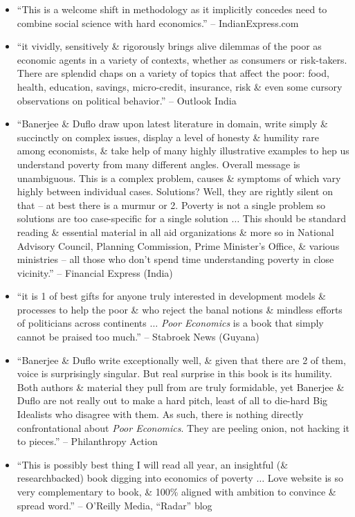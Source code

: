 \documentclass{article}
\begin{document}
\begin{enumerate}
\begin{itemize}
		\item ``This is a welcome shift in methodology as it implicitly concedes need to combine social science with hard economics.'' -- IndianExpress.com
		\item ``it vividly, sensitively \& rigorously brings alive dilemmas of the poor as economic agents in a variety of contexts, whether as consumers or risk-takers. There are splendid chaps on a variety of topics that affect the poor: food, health, education, savings, micro-credit, insurance, risk \& even some cursory observations on political behavior.'' -- Outlook India
		\item ``{\sc Banerjee \& Duflo} draw upon latest literature in domain, write simply \& succinctly on complex issues, display a level of honesty \& humility rare among economists, \& take help of many highly illustrative examples to hep us understand poverty from many different angles. Overall message is unambiguous. This is a complex problem, causes \& symptoms of which vary highly between individual cases. Solutions? Well, they are rightly silent on that -- at best there is a murmur or 2. Poverty is not a single problem so solutions are too case-specific for a single solution $\ldots$ This should be standard reading \& essential material in all aid organizations \& more so in National Advisory Council, Planning Commission, Prime Minister's Office, \& various ministries -- all those who don't spend time understanding poverty in close vicinity.'' -- Financial Express (India)
		\item ``it is 1 of best gifts for anyone truly interested in development models \& processes to help the poor \& who reject the banal notions \& mindless efforts of politicians across continents $\ldots$ {\it Poor Economics} is a book that simply cannot be praised too much.'' -- Stabroek News (Guyana)
		\item ``{\sc Banerjee \& Duflo} write exceptionally well, \& given that there are 2 of them, voice is surprisingly singular. But real surprise in this book is its humility. Both authors \& material they pull from are truly formidable, yet {\sc Banerjee \& Duflo} are not really out to make a hard pitch, least of all to die-hard Big Idealists who disagree with them. As such, there is nothing directly confrontational about {\it Poor Economics}. They are peeling onion, not hacking it to pieces.'' -- Philanthropy Action
		\item ``This is possibly best thing I will read all year, an insightful (\& researchbacked) book digging into economics of poverty $\ldots$ Love website is so very complementary to book, \& 100\% aligned with ambition to convince \& spread word.'' -- O'Reilly Media, ``Radar'' blog

\end{itemize}
\end{enumerate}
\end{document}

